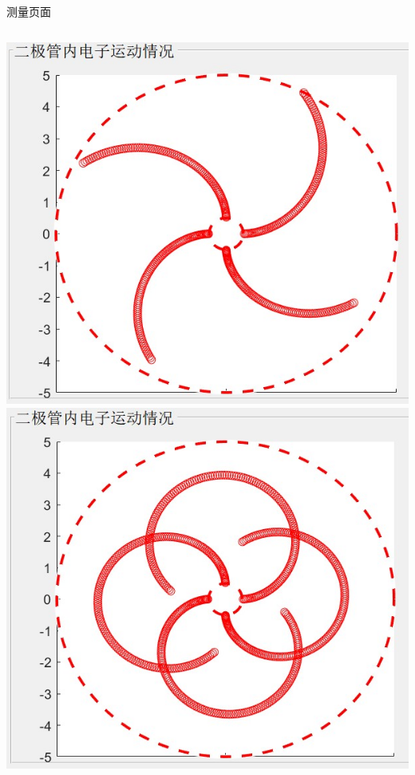 \documentclass{beamer}
\begin{document}
\begin{frame}{测量页面}{\thesection \, \secname}
\begin{columns}
            \begin{column}{0.3\textwidth}
                \includegraphics[scale=0.35]{gallery/move7.jpg}
                \includegraphics[scale=0.35]{gallery/move8.jpg}
            \end{column}
        \end{columns}
    \end{frame}
\end{document}
